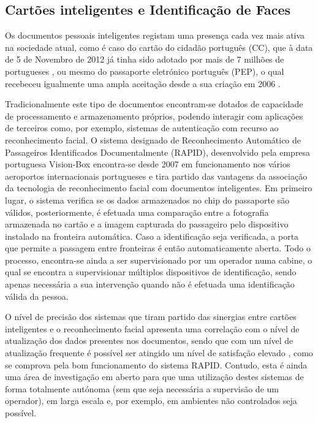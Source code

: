 \subsection{Cartões inteligentes e Identificação de Faces} \label{CartoesInteligentes}
Os documentos pessoais inteligentes registam uma presença cada vez mais ativa na sociedade atual, como é caso do cartão do cidadão português (CC), que à data de 5 de Novembro de 2012 já tinha sido adotado por mais de 7 milhões de portugueses \citep{Administrativa}, ou mesmo do passaporte eletrónico português (PEP), o qual recebeceu igualmente uma ampla aceitação desde a sua criação em 2006 \citep{MinisteriodaAdministracaoInterna}.

Tradicionalmente este tipo de documentos encontram-se dotados de capacidade de processamento e armazenamento próprios, podendo interagir com aplicações de terceiros como, por exemplo, sistemas de autenticação com recurso ao reconhecimento facial. O sistema designado de Reconhecimento Automático de Passageiros Identificados Documentalmente (RAPID)\citep{MinisteriodaAdministracaoInternaa}, desenvolvido pela empresa portuguesa Vision-Box \citep{Vision-Box} encontra-se desde 2007 em funcionamento nos vários aeroportos internacionais portugueses e tira partido das vantagens da associação da tecnologia de reconhecimento facial com documentos inteligentes. Em primeiro lugar, o sistema verifica se os dados armazenados no chip do passaporte são válidos, posteriormente, é efetuada uma comparação entre a fotografia armazenada no cartão e a imagem capturada do passageiro pelo dispositivo instalado na fronteira automática. Caso a identificação seja verificada, a porta que permite a passagem entre fronteiras é então automaticamente aberta. Todo o processo, encontra-se ainda a ser supervisionado por um operador numa cabine, o qual se encontra a supervisionar múltiplos dispositivos de identificação, sendo apenas necessária a sua intervenção quando não é efetuada uma identificação válida da pessoa.

O nível de precisão dos sistemas que tiram partido das sinergias entre cartões inteligentes e o reconhecimento facial apresenta uma correlação com o nível de atualização dos dados presentes nos documentos, sendo que  com um nível de atualização frequente é possível ser atingido um nível de satisfação elevado \cite{Li2011}, como se comprova pela bom funcionamento do sistema RAPID.
Contudo, esta é ainda uma área de investigação em aberto para que uma utilização destes sistemas de forma totalmente autónoma (sem que seja necessária a supervisão de um operador), em larga escala e, por exemplo, em ambientes não controlados seja possível.

